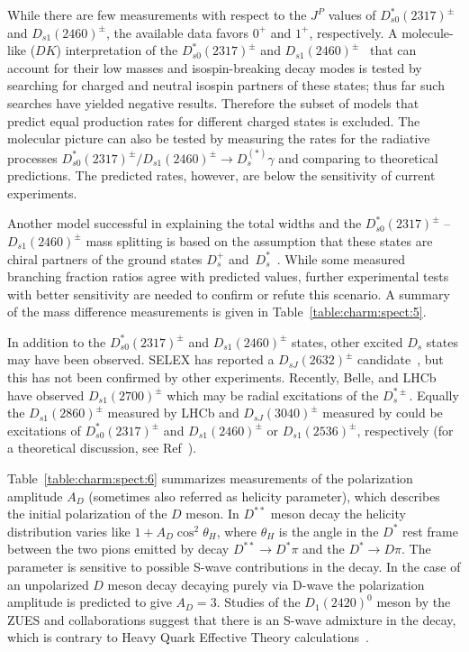 While there are few measurements with respect to the $J^P$ values of $D_{s0}^\ast(2317)^{\pm}$ and $D_{s1}(2460)^{\pm}$, the available data favors $0^+$ and $1^+$, respectively. A molecule-like ($DK$) interpretation of the $D_{s0}^\ast(2317)^{\pm}$ and $D_{s1}(2460)^{\pm}$~\cite{Barnes:2003dj,Lipkin:2003zk} that can account for their low masses and isospin-breaking decay modes is tested by searching for charged and neutral isospin partners of these states; thus far such searches have yielded negative results. Therefore the subset of models that predict equal production rates for different charged states is excluded. The molecular picture can also be tested by measuring the rates for the radiative processes $D_{s0}^\ast(2317)^{\pm}/D_{s1}(2460)^{\pm}\to D_s^{(\ast)}\gamma$ and comparing to theoretical predictions. The predicted rates, however, are below the sensitivity of current experiments. 

Another model successful in explaining the total widths and the $D_{s0}^\ast(2317)^{\pm}$ -- $D_{s1}(2460)^{\pm}$ mass splitting is based on the assumption that these states are chiral partners of the ground states $D_{s}^{+}$ and~$D_{s}^{*}$~\cite{Bardeen:2003kt}. While some measured branching fraction ratios agree with predicted
values, further experimental tests with better sensitivity are needed to confirm or refute this scenario. A summary of the mass difference measurements is given in Table~\ref{table:charm:spect:5}.

In addition to the $D_{s0}^\ast(2317)^{\pm}$ and $D_{s1}(2460)^{\pm}$ states, other excited $D_s$ states may have been observed. SELEX has reported a $D_{sJ}(2632)^{\pm}$ candidate~\cite{Evdokimov:2004iy}, but this has not been confirmed by other experiments. Recently, Belle, \babar{} and LHCb have observed $D_{s1}(2700)^{\pm}$ which may be radial excitations of the $D_s^{\ast\pm}$. Equally the $D_{s1}(2860)^{\pm}$ measured by LHCb and $D_{sJ}(3040)^{\pm}$ measured by \babar{} could be excitations of $D_{s0}^\ast(2317)^{\pm}$ and $D_{s1}(2460)^{\pm}$ or $D_{s1}(2536)^{\pm}$, respectively (for a theoretical discussion, see Ref~\cite{Matsuki:2006rz}).

Table~\ref{table:charm:spect:6} summarizes measurements of the polarization amplitude $A_{D}$ (sometimes also referred as helicity parameter), which describes the initial polarization of the $D$ meson. In $D^{\ast\ast}$ meson decay the helicity distribution varies like $1 + A_{D}\cos^{2}\theta_{H}$, where $\theta_{H}$ is the angle in the $D^{\ast}$ rest frame between the two pions emitted by decay $D^{\ast\ast} \to D^{\ast}\pi$ and the $D^{\ast} \to D \pi$. The parameter is sensitive to possible S-wave contributions in the decay. In the case of an unpolarized $D$ meson decay decaying purely via D-wave the polarization amplitude is predicted to give $A_{D}=3$. 
Studies of the $D_{1}(2420)^{0}$ meson by the ZUES and \babar{} collaborations suggest that there is an S-wave admixture in the decay, which is  contrary to Heavy Quark Effective Theory calculations~\cite{Isgur:1989vq,Neubert:1993mb}.

